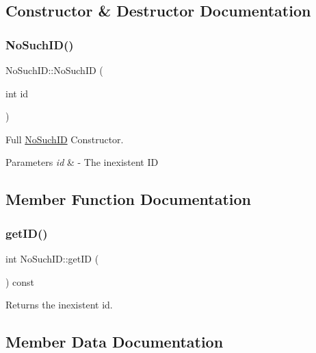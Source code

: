 \subsection{Constructor \& Destructor Documentation}
\mbox{\label{classNoSuchID_a3b85ef775a99d9f93eabaa21ef29e950}} 
\subsubsection{\texorpdfstring{No\+Such\+I\+D()}{NoSuchID()}}
{\footnotesize\ttfamily No\+Such\+I\+D\+::\+No\+Such\+ID (\begin{DoxyParamCaption}\item[{int}]{id }\end{DoxyParamCaption})\hspace{0.3cm}{\ttfamily [inline]}}



Full \hyperlink{classNoSuchID}{No\+Such\+ID} Constructor. 


\begin{DoxyParams}{Parameters}
{\em id} & -\/ The inexistent ID \\
\hline
\end{DoxyParams}


\subsection{Member Function Documentation}
\mbox{\label{classNoSuchID_a42be677d2a3bbf7c12feffeda0904bfa}} 
\subsubsection{\texorpdfstring{get\+I\+D()}{getID()}}
{\footnotesize\ttfamily int No\+Such\+I\+D\+::get\+ID (\begin{DoxyParamCaption}{ }\end{DoxyParamCaption}) const\hspace{0.3cm}{\ttfamily [inline]}}



Returns the inexistent id. 



\subsection{Member Data Documentation}
\mbox{\label{classNoSuchID_a1b0c95e546b2147a298230f33d3dbeec}} 
